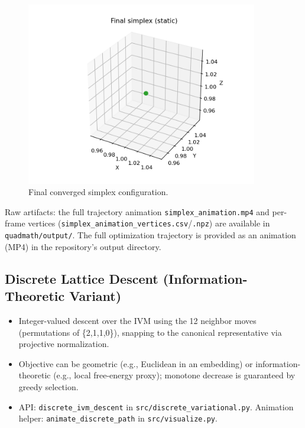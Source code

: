 \documentclass[
  10pt,
]{article}
\providecommand{\tightlist}{%
  \setlength{\itemsep}{0pt}\setlength{\parskip}{0pt}}
\begin{document}
\begin{figure}[htbp]
\centering
\includegraphics[width=0.9\textwidth]{figures/simplex_final.png}
\caption{Final converged simplex configuration.}
\label{fig:simplex_final}
\end{figure}

Raw artifacts: the full trajectory animation
\texttt{simplex\_animation.mp4} and per-frame vertices
(\texttt{simplex\_animation\_vertices.csv}/\texttt{.npz}) are available
in \texttt{quadmath/output/}. The full optimization trajectory is
provided as an animation (MP4) in the repository's output directory.

\hypertarget{discrete-lattice-descent-information-theoretic-variant}{%
\subsection{Discrete Lattice Descent (Information-Theoretic
Variant)}\label{discrete-lattice-descent-information-theoretic-variant}}

\begin{itemize}
\tightlist
\item
  Integer-valued descent over the IVM using the 12 neighbor moves
  (permutations of \{2,1,1,0\}), snapping to the canonical
  representative via projective normalization.
\item
  Objective can be geometric (e.g., Euclidean in an embedding) or
  information-theoretic (e.g., local free-energy proxy); monotone
  decrease is guaranteed by greedy selection.
\item
  API: \texttt{discrete\_ivm\_descent} in
  \texttt{src/discrete\_variational.py}. Animation helper:
  \texttt{animate\_discrete\_path} in \texttt{src/visualize.py}.
\end{itemize}
\end{document}
